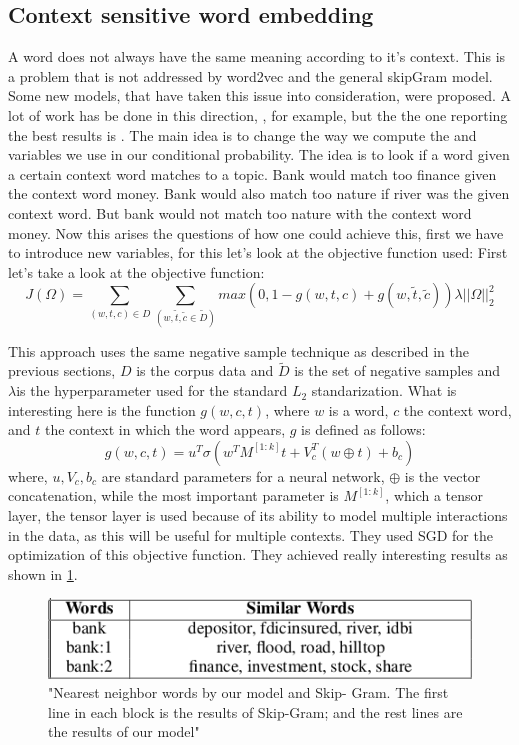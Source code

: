 \subsection{Context sensitive word embedding}
A word does not always have the same meaning according to it's context. This is a problem that is not addressed by word2vec and the general skipGram model. Some new models, that have taken this issue into consideration, were proposed. A lot of work has be done in this direction, \cite{topicalWE},  \cite{breaking} for example, but the the one reporting the best results is \cite{contextWithTensor}. The main idea is to change the way we compute the and variables we use in our conditional probability. The idea is to look if a word given a certain context word matches to a topic. Bank would match too finance given the context word money. Bank would also match too nature if river was the given context word. But bank would not match too nature with the context word money. Now this arises the questions of how one could achieve this, first we have to introduce new variables, for this let's look at the objective function used: 
First let's take a look at the objective function:
\begin{equation}
J(\Omega) = \sum_{(w,t,c)\in D} \sum_{(w,\tilde{t},\tilde{c} \in{\tilde{D}})} max(0,1- g(w,t,c) + g(w,\tilde{t},\tilde{c})) \lambda||\Omega||_{2}^2
\end{equation}

This approach uses the same negative sample technique as described in the previous sections, $D$ is the corpus data and $\tilde{D}$ is the set of negative samples and $\lambda$is the hyperparameter used for the standard $L_2$ standarization. What is interesting here is the function $g(w,c,t)$, where $w$ is a word, $c$ the context word, and $t$ the context in which the word appears, $g$ is defined as follows: 
\begin{equation}
g(w,c,t) = u^T \sigma(w^TM^{[1:k]}t+V_c^T(w \oplus t) + b_c)
\end{equation}
where, $u, V_c, b_c$ are standard parameters for a neural network, $\oplus$ is the vector concatenation, while the most important parameter is $M^{[1:k]}$, which a tensor layer, the tensor layer is used because of its ability to model multiple interactions in the data, as this will be useful for multiple contexts. They used SGD for the optimization of this objective function.  They achieved really interesting results as shown in \ref{fig:multipleContext}.
\begin{figure}[ht]
    \centering
			\includegraphics[scale=0.7]{images/multipleContext.png} 
    \caption{"Nearest  neighbor  words  by  our  model  and  Skip-
Gram. The first line in each block is the results of Skip-Gram;
and the rest lines are the results of our model" \cite{contextWithTensor}}
    \label{fig:multipleContext}
\end{figure}



